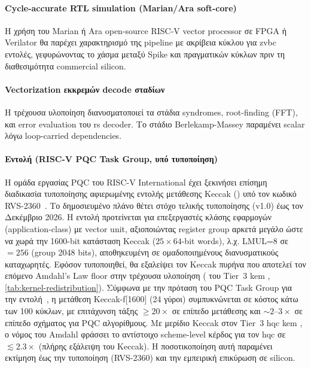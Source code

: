 \paragraph{Cycle-accurate RTL simulation (Marian/Ara soft-core)}
Η χρήση του Marian ή Ara open-source RISC-V vector processor σε FPGA ή
Verilator θα παρέχει χαρακτηρισμό της pipeline με ακρίβεια κύκλου για \gls{zvbc}
εντολές, γεφυρώνοντας το χάσμα μεταξύ Spike \instret και πραγματικών κύκλων
πριν τη διαθεσιμότητα commercial silicon.


\paragraph{Vectorization εκκρεμών decode σταδίων}
Η τρέχουσα υλοποίηση διανυσματοποιεί τα στάδια syndromes, root-finding (FFT), και
error evaluation του \gls{rs} decoder. Το στάδιο Berlekamp-Massey
παραμένει scalar λόγω loop-carried dependencies.

\label{sec:future-isa}

\paragraph{Εντολή  (RISC-V PQC Task Group, υπό τυποποίηση)}
Η ομάδα εργασίας PQC του RISC-V International έχει ξεκινήσει επίσημη διαδικασία
τυποποίησης αφιερωμένης εντολής μετάθεσης Keccak () υπό τον
κωδικό RVS-2360~\cite{RISCV-PQC-Keccak-Plan2026}. Το δημοσιευμένο πλάνο θέτει
στόχο τελικής τυποποίησης (v1.0) έως τον Δεκέμβριο 2026. 
Η εντολή προτείνεται για επεξεργαστές κλάσης εφαρμογών (application-class) με
vector unit, αξιοποιώντας register group αρκετά μεγάλο ώστε να χωρά την 1600-bit
κατάσταση Keccak ($25\times64$-bit words), λ.χ. LMUL=8 σε \VLEN${}=256$ (group 2048 bits),
αποθηκευμένη σε ομαδοποιημένους διανυσματικούς καταχωρητές. Εφόσον
τυποποιηθεί, θα εξαλείψει τον Keccak πυρήνα που αποτελεί τον επόμενο Amdahl's Law
floor στην τρέχουσα υλοποίηση ( του Tier~3 \gls{kem} \instret,
\cref{tab:kernel-redistribution}). Σύμφωνα με την πρόταση του PQC Task Group για
την εντολή~\cite{Saarinen2024-vkeccak}, η μετάθεση Keccak-f[1600] (24 γύροι)
συμπυκνώνεται σε κόστος κάτω των \num{100} κύκλων, με επιτάχυνση τάξης
$\geq\!20\times$ σε επίπεδο μετάθεσης και $\sim\!2$–$3\times$ σε επίπεδο σχήματος
για PQC αλγορίθμους. Με μερίδιο Keccak  στον Tier~3 \gls{hqc} \gls{kem}
\instret, ο νόμος του Amdahl φράσσει το αντίστοιχο scheme-level κέρδος για τον
\gls{hqc} σε $\lesssim\!2.3\times$ (πλήρης εξάλειψη του Keccak). Η ποσοτικοποίηση
αυτή παραμένει εκτίμηση έως την τυποποίηση (RVS-2360) και την εμπειρική επικύρωση
σε silicon.


